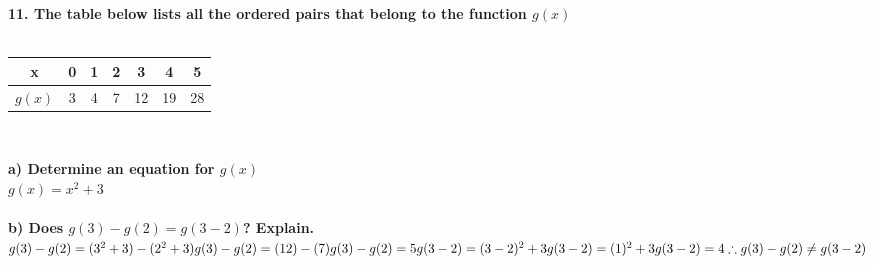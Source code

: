 \documentclass[14pt, a4paper]{extarticle}
\begin{document}
\textbf{11. The table below lists all the ordered pairs that belong to the function $g(x)$} \\ \\
\begin{tabular}{| c | c | c | c | c | c | c |}
    \hline
    x & 0 & 1 & 2 & 3 & 4 & 5 \\
    \hline
    $g(x)$ & 3 & 4 & 7 & 12 & 19 & 28 \\
    \hline
\end{tabular}
\\
\begin{adjustwidth}{1cm}{0pt}
    \textbf{a) Determine an equation for $g(x)$} \\
    $g(x) = x^2 + 3$ \\
    \\
    \textbf{b) Does $g(3) - g(2) = g(3 - 2)$? Explain.} \\
    \begin{math}
        g(3) - g(2) = (3^2 + 3) - (2^2 + 3) \\
        g(3) - g(2) = (12) - (7) \\
        g(3) - g(2) = 5 \\
        \\
        g(3 - 2) = (3 - 2)^2 + 3 \\
        g(3 - 2) = (1)^2 + 3 \\
        g(3 - 2) = 4 \\
        \\
        \therefore g(3) - g(2) \neq g(3 - 2) \\
    \end{math}
\end{adjustwidth}
\end{document}
